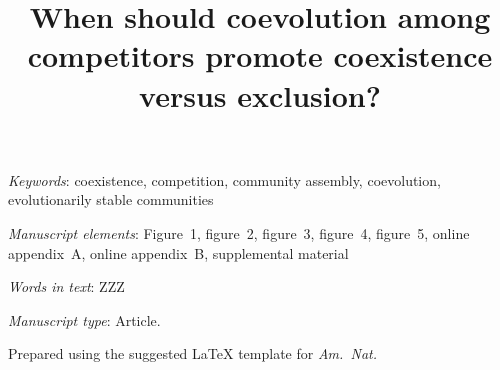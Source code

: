 \documentclass[11pt]{article}
\title{When should coevolution among competitors promote coexistence versus exclusion?}
\author{}
\date{}
\begin{document}

\maketitle

%
%

\bigskip

{
\parindent0pt

\textit{Keywords}: {
coexistence,
competition,
community assembly,
coevolution,
evolutionarily stable communities}


\bigskip


\textit{Manuscript elements}: Figure~1, figure~2, figure~3, figure~4, figure~5,
online appendix~A, online appendix~B,
supplemental material

\bigskip

\textit{Words in text}: ZZZ

\bigskip

\textit{Manuscript type}: Article.


\bigskip

\footnotesize Prepared using the suggested \LaTeX{} template for \textit{Am.\ Nat.}
}

\linenumbers{}
\modulolinenumbers[3]

\newpage{}
\raggedright
\setlength{\parindent}{20pt}
\end{document}
